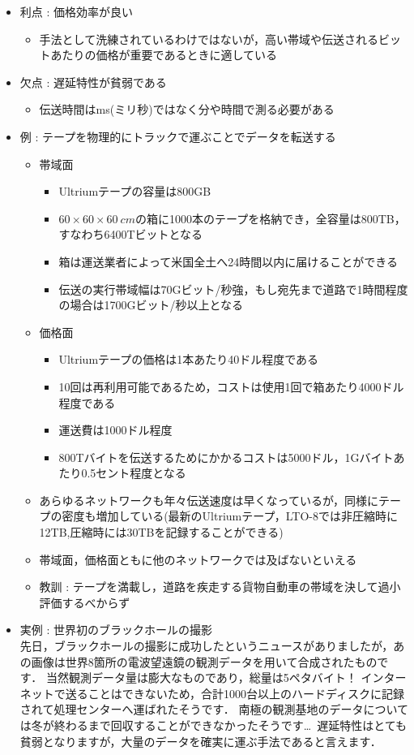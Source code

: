 \documentclass[a4paper]{ltjsarticle}
\begin{document}
			\begin{itemize}
				\item 利点 : 価格効率が良い
				\begin{itemize}
					\item 手法として洗練されているわけではないが，高い帯域や伝送されるビットあたりの価格が重要であるときに適している
				\end{itemize}
				\item 欠点 : 遅延特性が貧弱である
				\begin{itemize}
					\item 伝送時間は\si{ms}(ミリ秒)ではなく分や時間で測る必要がある
				\end{itemize}
				\item 例 : テープを物理的にトラックで運ぶことでデータを転送する
				\begin{itemize}
					\item 帯域面
					\begin{itemize}
						\item Ultriumテープの容量は800GB
						\item $60 \times 60 \times \SI{60}{cm}$の箱に1000本のテープを格納でき，全容量は800TB，すなわち6400Tビットとなる
						\item 箱は運送業者によって米国全土へ24時間以内に届けることができる
						\item 伝送の実行帯域幅は70Gビット/秒強，もし宛先まで道路で1時間程度の場合は1700Gビット/秒以上となる
					\end{itemize}
					\item 価格面
					\begin{itemize}
						\item Ultriumテープの価格は1本あたり40ドル程度である
						\item 10回は再利用可能であるため，コストは使用1回で箱あたり4000ドル程度である
						\item 運送費は1000ドル程度
						\item 800Tバイトを伝送するためにかかるコストは5000ドル，1Gバイトあたり0.5セント程度となる
					\end{itemize}
					\item あらゆるネットワークも年々伝送速度は早くなっているが，同様にテープの密度も増加している(最新のUltriumテープ，LTO-8では非圧縮時に12TB,圧縮時には30TBを記録することができる)
					\item 帯域面，価格面ともに他のネットワークでは及ばないといえる
					\item 教訓 : テープを満載し，道路を疾走する貨物自動車の帯域を決して過小評価するべからず
				\end{itemize}
				\item 実例 : 世界初のブラックホールの撮影\\
					先日，ブラックホールの撮影に成功したというニュースがありましたが，あの画像は世界8箇所の電波望遠鏡の観測データを用いて合成されたものです．
					当然観測データ量は膨大なものであり，総量は5ペタバイト！
					インターネットで送ることはできないため，合計1000台以上のハードディスクに記録されて処理センターへ運ばれたそうです．
					南極の観測基地のデータについては冬が終わるまで回収することができなかったそうです\dots\ 
					遅延特性はとても貧弱となりますが，大量のデータを確実に運ぶ手法であると言えます．
			\end{itemize}
\end{document}
